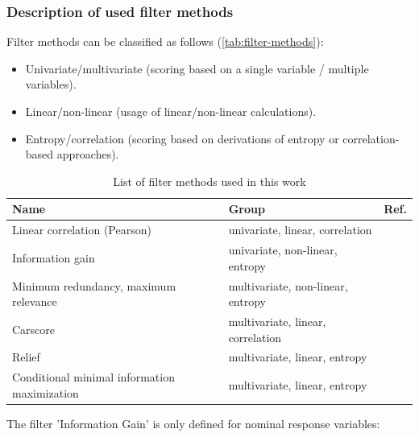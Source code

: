 \documentclass[peerreview]{IEEEtran}
\begin{document}
\subsubsection{Description of used filter methods}

Filter methods can be classified as follows (\autoref{tab:filter-methods}):

\begin{itemize}
	\item Univariate/multivariate (scoring based on a single variable / multiple variables).
	\item Linear/non-linear (usage of linear/non-linear calculations).
	\item Entropy/correlation (scoring based on derivations of entropy or correlation-based approaches).
\end{itemize}

\begin{table}[b!]
	\centering
	\caption{List of filter methods used in this work}
	\label{tab:filter-methods}
	\begingroup\footnotesize
	\begin{adjustbox}{width={0.48\textwidth},totalheight={\textheight},keepaspectratio}
		\begin{tabular}{lll}
			\\
			Name                                         & Group                             & Ref.               \\
			\toprule
			Linear correlation (Pearson)                 & univariate, linear, correlation   & \cite{pearson1901} \\
			Information gain                             & univariate, non-linear, entropy   & \cite{quinlan1986} \\
			Minimum redundancy, maximum relevance        & multivariate, non-linear, entropy & \cite{zhao2013}    \\
			Carscore                                     & multivariate, linear, correlation & \cite{zuber2011}   \\
			Relief                                       & multivariate, linear, entropy     & \cite{kira1992}    \\
			Conditional minimal information maximization & multivariate, linear, entropy     & \cite{fleuret2004}
		\end{tabular}
	\end{adjustbox}
	\endgroup
\end{table}

The filter 'Information Gain' is only defined for nominal response variables:
\end{document}
